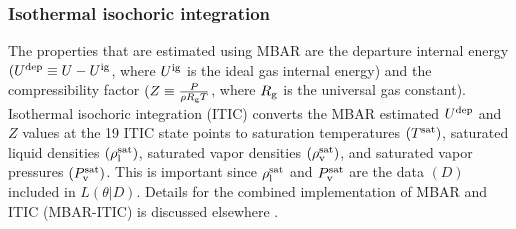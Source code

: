 \documentclass[preprint,letterpaper,floatfix,citeautoscript,aip,jcp]{revtex4-1}
\begin{document}




\subsubsection{Isothermal isochoric integration}

The properties that are estimated using MBAR are the 
departure internal energy $(U^{\rm dep} \equiv U-U^{\rm ig}$, where $U^{\rm ig}$ is the ideal gas internal energy) and the compressibility factor $(Z \equiv \frac{P}{\rho R_{\rm g} T}$, where $R_{\rm g}$ is the universal gas constant). 
Isothermal isochoric integration (ITIC) converts the MBAR estimated $U^{\rm dep}$ and $Z$ values at the 19 ITIC state points to saturation temperatures $(T^{\rm sat})$, saturated liquid densities $(\rho_{\rm l}^{\rm sat})$, saturated vapor densities $(\rho_{\rm v}^{\rm sat})$, and saturated vapor pressures $(P_{\rm v}^{\rm sat})$. This is important since $\rho_{\rm l}^{\rm sat}$ and $P_{\rm v}^{\rm sat}$ are the data $(D)$ included in $L(\theta|D)$. Details for the combined implementation of MBAR and ITIC (MBAR-ITIC) is discussed elsewhere \cite{Postdoc_1}. 
\end{document}
